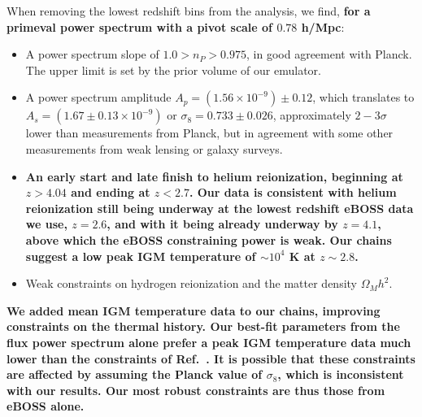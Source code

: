 When removing the lowest redshift bins from the analysis, we find, \textbf{for a primeval power spectrum with a pivot scale of $0.78$ h/Mpc}:
\begin{itemize}
    \item A power spectrum slope of $1.0 > n_P > 0.975$, in good agreement with Planck.
    The upper limit is set by the prior volume of our emulator.
    \item A power spectrum amplitude $A_p=\left(1.56\times10^{-9}\right) \pm 0.12$, which translates to $A_s=\left(1.67\pm0.13\times10^{-9}\right)$ or $\sigma_8 = 0.733 \pm 0.026$, approximately $2-3\sigma$ lower than measurements from Planck, but in agreement with some other measurements from weak lensing or galaxy surveys.
    \item \textbf{An early start and late finish to helium reionization, beginning at $z > 4.04$ and ending at $z < 2.7$. Our data is consistent with helium reionization still being underway at the lowest redshift  eBOSS data we use, $z=2.6$, and with it being already underway by $z=4.1$, above which the eBOSS constraining power is weak. Our chains suggest a low peak IGM temperature of $\sim 10^4$ K at $z\sim 2.8$.}
    \item Weak constraints on hydrogen reionization and the matter density $\Omega_M h^2$.
\end{itemize}

\textbf{We added mean IGM temperature data to our chains, improving constraints on the thermal history. Our best-fit parameters from the flux power spectrum alone prefer a peak IGM temperature data much lower than the constraints of Ref.~\cite{2021MNRAS.506.4389G}. It is possible that these constraints are affected by assuming the Planck value of $\sigma_8$, which is inconsistent with our results. Our most robust constraints are thus those from eBOSS alone.}

